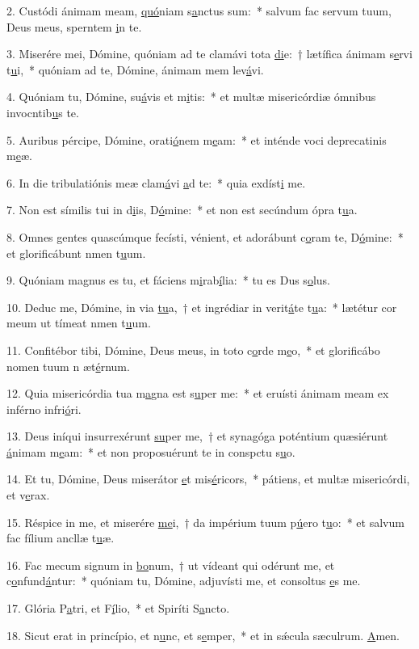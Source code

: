 2. Custódi ánimam meam, \uline{quó}niam s\uline{a}nctus sum:~* salvum fac servum tuum, Deus meus, sperntem \uline{i}n te.\par 
3. Miserére mei, Dómine, quóniam ad te clamávi tota \uline{di}e:~† lætífica ánimam s\uline{e}rvi t\uline{u}i,~* quóniam ad te, Dómine, ánimam mem lev\uline{á}vi.\par 
4. Quóniam tu, Dómine, su\uline{á}vis et m\uline{i}tis:~* et multæ misericórdiæ ómnibus invocntib\uline{u}s te.\par 
5. Auribus pércipe, Dómine, orati\uline{ó}nem m\uline{e}am:~* et inténde voci deprecatinis m\uline{e}æ.\par 
6. In die tribulatiónis meæ clam\uline{á}vi \uline{a}d te:~* quia exdíst\uline{i} me.\par 
7. Non est símilis tui in d\uline{i}is, D\uline{ó}mine:~* et non est secúndum ópra t\uline{u}a.\par 
8. Omnes gentes quascúmque fecísti, vénient, et adorábunt c\uline{o}ram te, D\uline{ó}mine:~* et glorificábunt nmen t\uline{u}um.\par 
9. Quóniam magnus es tu, et fáciens m\uline{i}rab\uline{í}lia:~* tu es Dus s\uline{o}lus.\par 
10. Deduc me, Dómine, in via \uline{tu}a,~† et ingrédiar in verit\uline{á}te t\uline{u}a:~* lætétur cor meum ut tímeat nmen t\uline{u}um.\par 
11. Confitébor tibi, Dómine, Deus meus, in toto c\uline{o}rde m\uline{e}o,~* et glorificábo nomen tuum n æt\uline{é}rnum.\par 
12. Quia misericórdia tua m\uline{a}gna est s\uline{u}per me:~* et eruísti ánimam meam ex inférno infri\uline{ó}ri.\par 
13. Deus iníqui insurrexérunt \uline{su}per me,~† et synagóga poténtium quæsiérunt \uline{á}nimam m\uline{e}am:~* et non proposuérunt te in conspctu s\uline{u}o.\par 
14. Et tu, Dómine, Deus miserátor \uline{e}t mis\uline{é}ricors,~* pátiens, et multæ misericórdi, et v\uline{e}rax.\par 
15. Réspice in me, et miserére \uline{me}i,~† da impérium tuum p\uline{ú}ero t\uline{u}o:~* et salvum fac fílium ancllæ t\uline{u}æ.\par 
16. Fac mecum signum in \uline{bo}num,~† ut vídeant qui odérunt me, et c\uline{o}nfund\uline{á}ntur:~* quóniam tu, Dómine, adjuvísti me, et consoltus \uline{e}s me.\par 
17. Glória P\uline{a}tri, et F\uline{í}lio,~* et Spiríti S\uline{a}ncto.\par 
18. Sicut erat in princípio, et n\uline{u}nc, et s\uline{e}mper,~* et in sǽcula sæculrum. \uline{A}men.\par 
